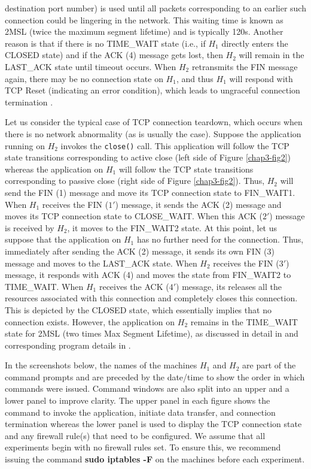 \begin{multicols}{2}
\noindent
destination port number) is used until all packets corresponding to an earlier such connection could be lingering in the network. This waiting time is known as 2MSL (twice the maximum segment lifetime) and is typically 120s. Another reason is that if there is no TIME\_WAIT state (i.e., if $H_{1}$ directly enters the CLOSED state) and if the ACK (4) message gets lost, then $H_{2}$ will remain in the LAST\_ACK state until timeout occurs. When $H_{2}$ retransmits the FIN message again, there may be no connection state on $H_{1}$, and thus $H_{1}$ will respond with TCP Reset (indicating an error condition), which leads to ungraceful connection termination \cite{chap3-key8}.

Let us consider the typical case of TCP connection teardown, which occurs when there is no network abnormality (as is usually the case). Suppose the application running on $H_{2}$ invokes the \lstinline|close()| call. This application will follow the TCP state transitions corresponding to active close (left side of Figure \ref{chap3-fig2}) whereas the application on $H_{1}$ will follow the TCP state transitions corresponding to passive close (right side of Figure \ref{chap3-fig2}). Thus, $H_{2}$ will send the FIN (1) message and move its TCP connection state to FIN\_WAIT1. When $H_{1}$ receives the FIN ($1'$) message, it sends the ACK (2) message and moves its TCP connection state to CLOSE\_WAIT. When this ACK ($2'$) message is received by $H_{2}$, it moves to the FIN\_WAIT2 state. At this point, let us suppose that the application on $H_{1}$ has no further need for the connection. Thus, immediately after sending the ACK (2) message, it sends its own FIN (3) message and moves to the LAST\_ACK state. When $H_{2}$ receives the FIN ($3'$) message, it responds with ACK (4) and moves the state from FIN\_WAIT2 to TIME\_WAIT. When $H_{1}$ receives the ACK ($4'$) message, its releases all the resources associated with this connection and completely closes this connection. This is depicted by the CLOSED state, which essentially implies that no connection exists. However, the application on $H_{2}$ remains in the TIME\_WAIT state for 2MSL (two times Max Segment Lifetime), as discussed in detail in \cite{chap3-key8} and corresponding program details in \cite{chap3-key9}.  

In the screenshots below, the names of the machines $H_{1}$ and $H_{2}$ are part of the command prompts and are preceded by the date/time to show the order in which commands were issued. Command windows are also split into an upper and a lower panel to improve clarity. The upper panel in each figure shows the command to invoke the application, initiate data transfer, and connection termination whereas the lower panel is used to display the TCP connection state and any firewall rule(s) that need to be configured. We assume that all experiments begin with no firewall rules set. To ensure this, we recommend issuing the command \textbf{sudo iptables -F} on the machines before each experiment.


\end{multicols}
